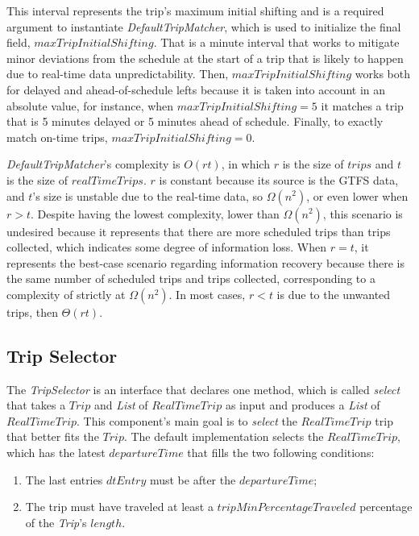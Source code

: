 This interval represents the trip's maximum initial shifting 
and is a required argument to instantiate \textit{DefaultTripMatcher}, which is 
used to initialize the final field, $maxTripInitialShifting$. 
That is a minute interval that works to mitigate minor deviations from
the schedule at the start of  a trip that is likely to happen due to real-time data 
unpredictability. 
Then, $maxTripInitialShifting$ works both for delayed and ahead-of-schedule lefts because 
it is taken into account in an absolute value, 
for instance, when $maxTripInitialShifting=5$ it matches a trip that is 5 minutes delayed or 5 minutes ahead of schedule. Finally, to exactly match on-time trips, $maxTripInitialShifting = 0$. 

\textit{DefaultTripMatcher}'s complexity is $O(rt)$, in which $r$ is the size of $trips$
and $t$ is the size of $realTimeTrips$. $r$ is constant because its source
is the GTFS data, and $t$'s size is unstable due to the real-time data, 
so $\Omega(n^2)$, or even lower when $r > t$.
Despite having the lowest complexity, lower than $\Omega(n^2)$, this scenario
is undesired because it represents that there are more scheduled trips than 
trips collected, which indicates some degree of information loss. 
When $r = t$, it represents the best-case scenario regarding information
recovery because there is the same number of scheduled trips and trips collected,
corresponding to a complexity of strictly at $\Omega(n^2)$. In most cases, $r < t$ is due to
the unwanted trips, then $\Theta(rt)$.


\subsection{Trip Selector}
The \textit{TripSelector} is an interface that declares one method, which is called
\textit{select} that takes a $Trip$ and \textit{List} of $RealTimeTrip$ as input 
and produces a \textit{List} of $RealTimeTrip$. This component's main goal is to
{\em select} the $RealTimeTrip$ trip that better fits the $Trip$.
The default implementation selects the $RealTimeTrip$, which has the latest 
$departureTime$ that fills the two following conditions:
\begin{enumerate}
    \item The last entries $dtEntry$ must be after the $departureTime$;
    \item The trip must have traveled at least a $tripMinPercentageTraveled$ percentage of the \textit{Trip}'s $length$.
\end{enumerate}


